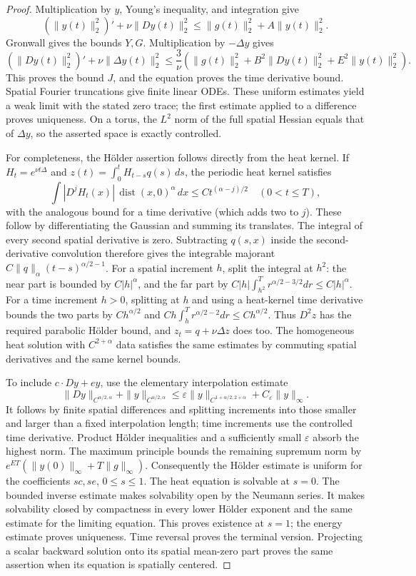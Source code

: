 \documentclass[11pt,a4paper]{article}
\begin{document}
\begin{proof}
Multiplication by $y$, Young's inequality, and integration give
\[
 (\|y(t)\|_2^2)' +\nu\|Dy(t)\|_2^2
 \leq \|g(t)\|_2^2+A\|y(t)\|_2^2.
\]
Gronwall gives the bounds $Y,G$. Multiplication by $-\Delta y$ gives
\[
 (\|Dy(t)\|_2^2)' +\nu\|\Delta y(t)\|_2^2
 \leq\frac3\nu(\|g(t)\|_2^2+B^2\|Dy(t)\|_2^2
                                  +E^2\|y(t)\|_2^2).
\]
This proves the bound $J$, and the equation proves the time derivative
bound. Spatial Fourier truncations give finite linear ODEs. These
uniform estimates yield a weak limit with the stated zero trace;
the first estimate applied to a difference proves uniqueness. On a
torus, the $L^2$ norm of the full spatial Hessian equals that of
$\Delta y$, so the asserted space is exactly controlled.

For completeness, the H\"older assertion follows directly from the heat
kernel. If $H_t=e^{\nu t\Delta}$ and
$z(t)=\int_0^t H_{t-s}q(s)\,ds$, the periodic heat kernel satisfies
\[
 \int |D^j H_t(x)|\,\operatorname{dist}(x,0)^\alpha\,dx
       \leq C t^{(\alpha-j)/2}\quad(0<t\leq T),
\]
with the analogous bound for a time derivative (which adds two to $j$).
These follow by differentiating the Gaussian and summing its translates.
The integral of every second spatial derivative is zero. Subtracting
$q(s,x)$ inside the second-derivative convolution therefore gives the
integrable majorant $C\|q\|_\alpha(t-s)^{\alpha/2-1}$.
For a spatial increment $h$, split the integral at $h^2$: the near
part is bounded by $C|h|^\alpha$, and the far part by
$C|h|\int_{h^2}^T r^{\alpha/2-3/2}dr\leq C|h|^\alpha$.
For a time increment $h>0$, splitting at $h$ and using a heat-kernel
time derivative bounds the two parts by
$Ch^{\alpha/2}$ and
$Ch\int_h^T r^{\alpha/2-2}dr\leq Ch^{\alpha/2}$.
Thus $D^2z$ has the required parabolic H\"older bound, and
$z_t=q+\nu\Delta z$ does too. The homogeneous heat solution with
$C^{2+\alpha}$ data satisfies the same estimates by commuting spatial
derivatives and the same kernel bounds.

To include $c\cdot Dy+ey$, use the elementary interpolation estimate
\[
 \|Dy\|_{C^{\alpha/2,\alpha}}+
 \|y\|_{C^{\alpha/2,\alpha}}
 \leq\varepsilon\|y\|_{C^{1+\alpha/2,2+\alpha}}
                         +C_\varepsilon\|y\|_\infty.
\]
It follows by finite spatial differences and splitting increments into
those smaller and larger than a fixed interpolation length; time
increments use the controlled time derivative. Product H\"older
inequalities and a sufficiently small $\varepsilon$ absorb the highest
norm. The maximum principle bounds the remaining supremum norm by
$e^{ET}(\|y(0)\|_\infty+T\|g\|_\infty)$.
Consequently the H\"older estimate is uniform for the coefficients
$sc,se$, $0\leq s\leq1$. The heat equation is solvable at $s=0$.
The bounded inverse estimate makes solvability open by the Neumann
series. It makes solvability closed by compactness in every lower
H\"older exponent and the same estimate for the limiting equation.
This proves existence at $s=1$; the energy estimate proves uniqueness.
Time reversal proves the terminal version. Projecting a scalar
backward solution onto its spatial mean-zero part proves the same
assertion when its equation is spatially centered.
\end{proof}
\end{document}
